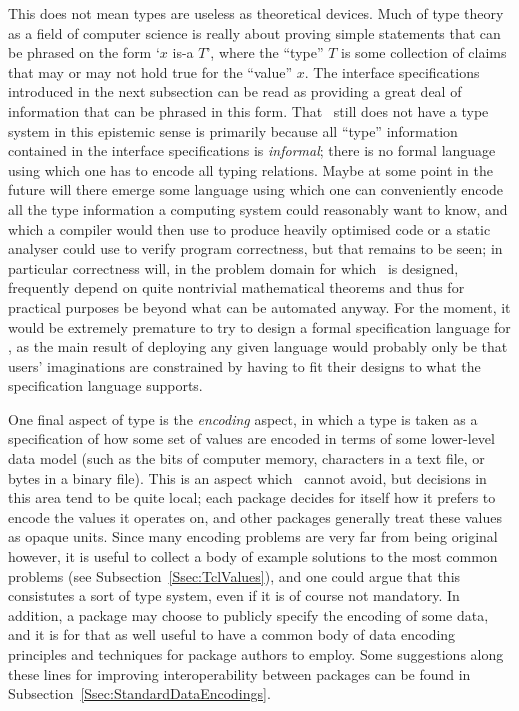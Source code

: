 \documentclass{mtmtcl}
\theoremstyle{plain}
\theoremstyle{remark}
\begin{document}
This does not mean types are useless as theoretical devices. Much of 
type theory as a field of computer science is really about proving 
simple statements that can be phrased on the form `$x$ is-a $T$', 
where the ``type'' $T$ is some collection of claims that may or 
may not hold true for the ``value'' $x$. The interface specifications 
introduced in the next subsection can be read as providing a great deal 
of information that can be phrased in this form. That \mtl\ still 
does not have a type system in this epistemic sense is primarily 
because all ``type'' information contained in the interface 
specifications is \emph{informal}; there is no formal language using 
which one has to encode all typing relations. Maybe at some point in 
the future will there emerge some language using which one can 
conveniently encode all the type information a computing system 
could reasonably want to know, and which a compiler would then use to 
produce heavily optimised code or a static analyser could use to 
verify program correctness, but that remains to be seen; in 
particular correctness will, in the problem domain for which \mtl\ is 
designed, frequently depend on quite nontrivial mathematical theorems 
and thus for practical purposes be beyond what can be automated anyway. 
For the moment, it would be extremely premature to try to design a 
formal specification language for \mtl, as the main result of 
deploying any given language would probably only be that users' 
imaginations are constrained by having to fit their designs to 
what the specification language supports.

One final aspect of type is the \emph{encoding} aspect, in which a 
type is taken as a specification of how some set of values are 
encoded in terms of some lower-level data model (such as the bits of 
computer memory, characters in a text file, or bytes in a binary file). 
This is an aspect which \mtl\ cannot avoid, but decisions in this area 
tend to be quite local; each package decides for itself how it prefers 
to encode the values it operates on, and other packages generally treat 
these values as opaque units. Since many encoding problems are very 
far from being original however, it is useful to collect a body of 
example solutions to the most common problems (see 
Subsection~\ref{Ssec:TclValues}), and one could argue that this 
consistutes a sort of type system, even if it is of course 
not mandatory. In addition, a package may choose to publicly specify 
the encoding of some data, and it is for that as well useful to have a 
common body of data encoding principles and techniques for package 
authors to employ. Some suggestions along these lines for improving 
interoperability between packages can be found in 
Subsection~\ref{Ssec:StandardDataEncodings}.
\end{document}
